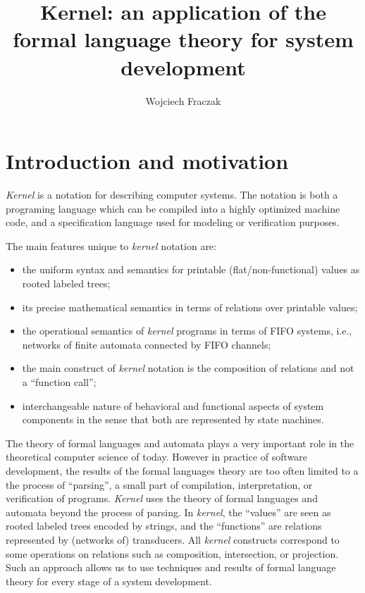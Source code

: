 \documentclass{book}
\title{Kernel: an application of the formal language theory for system
  development} \author{Wojciech Fraczak}
\newcommand{\kernel}{{\it kernel}}
\newcommand{\Kernel}{{\it Kernel}}
\begin{document}
\maketitle

\chapter*{Introduction and motivation}

\Kernel{} is a notation for describing computer systems. The notation
is both a programing language which can be compiled into a highly
optimized machine code, and a specification language used for modeling or
verification purposes.

The main features unique to \kernel{} notation are:
\begin{itemize}
\item the uniform syntax and semantics for printable (flat/non-functional)
  values as rooted labeled trees; 
\item its precise mathematical semantics in terms of relations over
  printable values;
\item the operational semantics of \kernel{} programs in terms of FIFO
  systems, i.e., networks of finite automata connected by FIFO
  channels;
\item the main construct of \kernel{} notation is the composition of
  relations and not a ``function call''; 
\item interchangeable nature of behavioral and functional aspects of
  system components in the sense that both are represented by state
  machines.
\end{itemize}

The theory of formal languages and automata plays a very important
role in the theoretical computer science of today. However in practice
of software development, the results of the formal languages theory
are too often limited to a the process of ``parsing'', a small part of
compilation, interpretation, or verification of programs. \Kernel{}
uses the theory of formal languages and automata beyond the process of
parsing. In \kernel{}, the ``values'' are seen as rooted labeled trees
encoded by strings, and the ``functions'' are relations represented by
(networks of) transducers. All \kernel{} constructs correspond to some
operations on relations such as composition, intersection, or
projection. Such an approach allows us to use techniques and results
of formal language theory for every stage of a system development.
\end{document}
